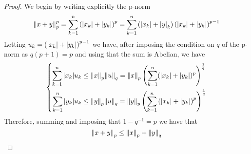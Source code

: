 \documentclass[../complete.tex]{subfiles}
\begin{document}
\begin{proof}
	We begin by writing explicitly the p-norm
	\begin{equation*}
		\norm{x+y}_p^p=\sum_{k=1}^n\left( \abs{x_k}+\abs{y_k} \right)^p=\sum_{k=1}^n\left( \abs{x_k}+\abs{y}_k \right)\left( \abs{x_k}+\abs{y_k} \right)^{p-1}
	\end{equation*}
	Letting $u_k=\left( \abs{x_k}+\abs{y_k} \right)^{p-1}$ we have, after imposing the condition on $q$ of the p-norm as $q(p+1)=p$ and using that the sum is Abelian, we have
	\begin{equation*}
		\left\{\begin{aligned}
				\sum_{k=1}^n\abs{x_k}u_k&\le\norm{x}_p\norm{u}_q=\norm{x}_p\left(\sum_{k=1}^n(\abs{x_k}+\abs{y_k})^p\right)^{\frac{1}{q}}\\
				\sum_{k=1}^n\abs{y_k}u_k&\le\norm{y}_p\norm{u}_q=\norm{y}_p\left( \sum_{k=1}^n\left( \abs{x_k}+\abs{y_k} \right)^p \right)^{\frac{1}{q}}
		\end{aligned}\right.
	\end{equation*}
	Therefore, summing and imposing that $1-q^{-1}=p$ we have that
	\begin{equation*}
		\norm{x+y}_p\le\norm{x}_p+\norm{y}_q
	\end{equation*}
\end{proof}
\end{document}
